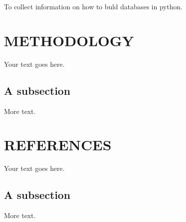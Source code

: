 \documentclass[11pt]{article} %
\begin{document}
 To collect information on how to buld databases in python.
 


\section{METHODOLOGY}

Your text goes here.

\subsection{A subsection}

More text.
\section{REFERENCES}

Your text goes here.

\subsection{A subsection}

More text.
\end{document}
